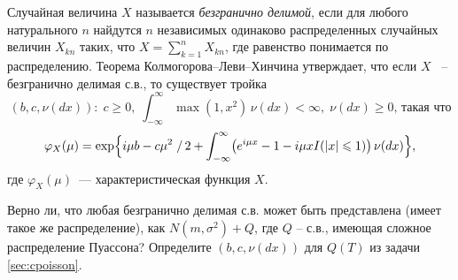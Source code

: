 \begin{problem}
\label{sec:infdiv}
Случайная величина $X$ называется \textit{безгранично делимой}, если для любого натурального $n$ найдутся $n$ независимых одинаково распределенных случайных величин $X_{kn}$ таких, что $X = \sum_{k=1}^{n}{X_{kn}}$, где равенство понимается по распределению. Теорема Колмогорова--Леви--Хинчина утверждает, что если $X$ ~-- безгранично делимая с.в., то существует тройка
$$
 (b,c,\nu(dx)): \; 
c\geqslant 0, \; \int_{-\infty}^{\infty} \max(1,x^2)\, \nu(dx)<\infty, \; \nu(dx)\geqslant 0 \text{, такая что} 
$$
\[
\varphi_{X}(\mu)
=\exp \Bigl\{  i\mu b-c\mu^2\left.\right/2+
\int_{-\infty}^{\infty} \bigl( e^{i\mu x}-1-i\mu x I(|x|\leqslant 1) \bigr)\, \nu(dx) 
\Bigr\}, 
\]
где $\varphi_{X}(\mu)$~--- характеристическая функция $X$.

Верно ли, что любая безгранично делимая с.в. может быть представлена (имеет такое же распределение), как $N(m, \sigma^2) + Q$, где $Q$ -- с.в., имеющая сложное распределение Пуассона?
Определите $(b,c,\nu(dx))$ для $Q(T)$ из задачи 
\ref{sec:cpoisson}.

\end{problem}
